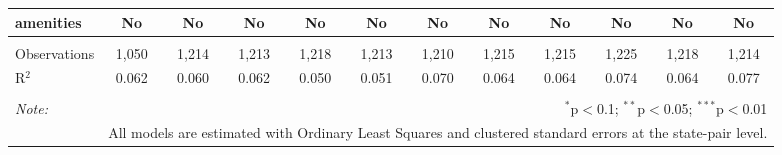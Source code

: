 \begin{table}[!htbp]
\begin{tabular}{@{\extracolsep{5pt}}lccccccccccc}
amenities & No & No & No & No & No & No & No & No & No & No & No \\ 
\hline \\[-1.8ex] 
Observations & 1,050 & 1,214 & 1,213 & 1,218 & 1,213 & 1,210 & 1,215 & 1,215 & 1,225 & 1,218 & 1,214 \\ 
R$^{2}$ & 0.062 & 0.060 & 0.062 & 0.050 & 0.051 & 0.070 & 0.064 & 0.064 & 0.074 & 0.064 & 0.077 \\ 
\hline 
\hline \\[-1.8ex] 
\textit{Note:}  & \multicolumn{11}{r}{$^{*}$p$<$0.1; $^{**}$p$<$0.05; $^{***}$p$<$0.01} \\ 
 & \multicolumn{11}{r}{All models are estimated with Ordinary Least Squares and clustered standard errors at the state-pair level.} \\ 
\end{tabular} 
\end{table} 
